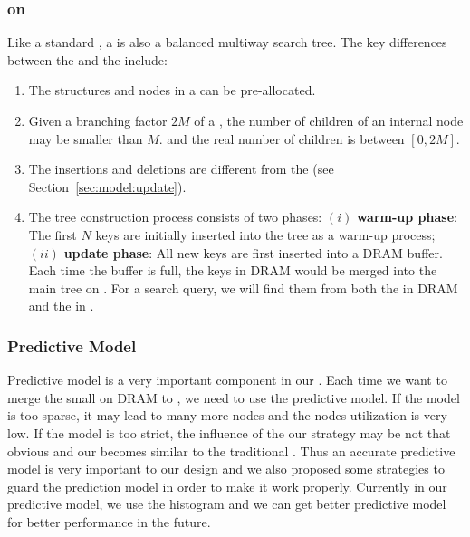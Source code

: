 \subsubsection{\bptree on \pcm}
  Like a standard \bplustree,
  a \bptree is also a balanced multiway search tree.
  The key differences between the \bptree and the \bplustree include:
  \begin{enumerate}
    \item The structures and nodes in a \bptree can be pre-allocated.
    \item Given a branching factor $2M$ of a \bptree,
  the number of children of an internal node may be smaller than $M$.
  and the real number of children is between $[0, 2M]$.
    \item The insertions and deletions are different from the \bplustree (see Section~\ref{sec:model:update}).
    \item The tree construction
  process consists of two phases: $(i)$ \textbf{warm-up phase}:
  The first $N$ keys are initially inserted into the tree as a warm-up process;
  $(ii)$ \textbf{update phase}:
  All new keys are first inserted into a DRAM buffer.
  Each time the buffer is full, the keys in DRAM would be merged into the main tree on \pcm.
  For a search query, we will find them from both the \bplustree in DRAM and
  the \bptree in \pcm.
  \end{enumerate}

\subsubsection{Predictive Model}
Predictive model is a very important component in our \bptree. Each time we want to merge the small
\bplustree on DRAM to \pcm, we need to use the predictive model. If the model is too sparse, it may 
lead to many more nodes and the nodes utilization is very low. If the model is too strict, the influence 
of the our strategy may be not that obvious and our \bptree becomes similar to the traditional \bplustree. 
Thus an accurate predictive model is very important to our design and we also proposed some strategies
to guard the prediction model in order to make it work properly. Currently in our predictive model, we use 
the histogram and we can get better predictive model for better performance in the future. 


